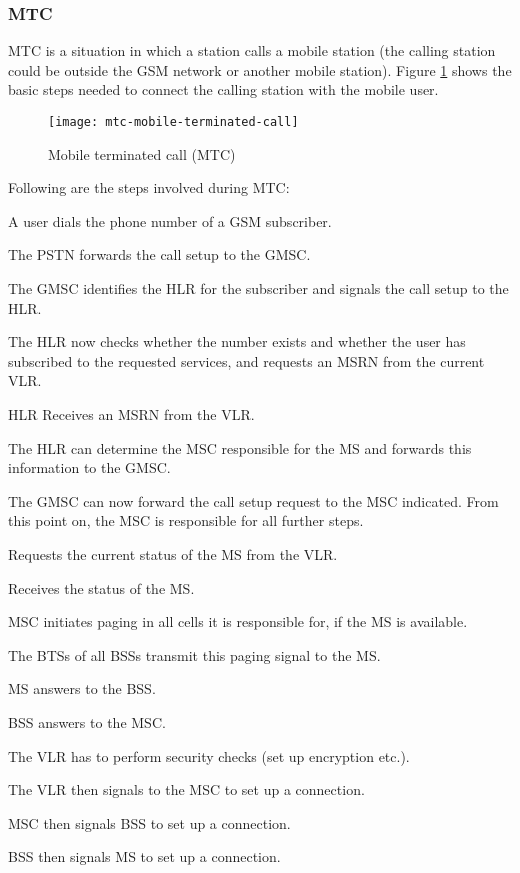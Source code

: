 \subsubsection{MTC}
MTC is a situation in which a station calls a mobile station (the calling station could be outside the GSM network or another mobile station). Figure \ref{fig:mtc-mobile-terminated-call} shows the basic steps needed to connect the calling station with the mobile user. 

\begin{figure}[hb!]
	\centering
	\texttt{[image: mtc-mobile-terminated-call]}
	\caption{Mobile terminated call (MTC)}
	\label{fig:mtc-mobile-terminated-call}
\end{figure}

Following are the steps involved during MTC:
\begin{steps}
\item A user dials the phone number of a GSM subscriber. 
\item The PSTN forwards the call setup to the GMSC.
\item The GMSC identifies the HLR for the subscriber and signals the call setup to the HLR.
\item The HLR now checks whether the number exists and whether the user has subscribed to the requested services, and requests an MSRN from the current VLR.
\item HLR Receives an MSRN from the VLR.
\item The HLR can determine the MSC responsible for the MS and forwards this information to the GMSC.
\item The GMSC can now forward the call setup request to the MSC indicated.
		\subitem From this point on, the MSC is responsible for all further steps.
\item Requests the current status of the MS from the VLR.
\item Receives the status of the MS.
\item MSC initiates paging in all cells it is responsible for, if the MS is available.
\item The BTSs of all BSSs transmit this paging signal to the MS.
\item MS answers to the BSS.
\item BSS answers to the MSC.
\item The VLR has to perform security checks (set up encryption etc.).
\item The VLR then signals to the MSC to set up a connection.
\item MSC then signals BSS to set up a connection.
\item BSS then signals MS to set up a connection.
\end{steps}




